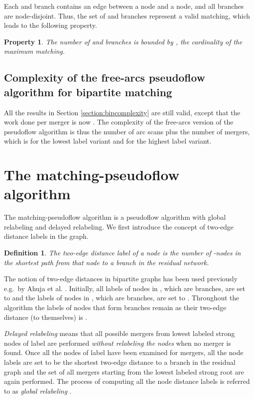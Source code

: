 \documentclass{article}
\newtheorem{property}{Property}[section]
\newtheorem{definition}{Definition}[section]
\begin{document}
Each  and  branch contains an edge between a  node and a  node, and all branches are node-disjoint. Thus, the set of  and  branches represent a valid matching, which leads to the following property.

\begin{property}
\label{property:branchbound}
The number of  and  branches is bounded by , the cardinality of the maximum matching.
\end{property}

\subsection{Complexity of the free-arcs pseudoflow algorithm for bipartite matching}

All the results in Section \ref{section:bipcomplexity} are still valid, except that the work done per merger is now .  The complexity of the free-arcs version of the pseudoflow algorithm is thus the number of arc scans plus the number of mergers, which is \mbox{} for the lowest label variant and  for the highest label variant.

\section{The matching-pseudoflow algorithm}
\label{section:matching-pseudoflow}

The {\sf matching-pseudoflow} algorithm is a pseudoflow algorithm with global relabeling and delayed relabeling.  We first introduce the concept of two-edge distance labels in the graph.

\begin{definition}
The {\em two-edge distance label} of a node is the number of -nodes in the shortest path from that node to a  branch in the residual network.
\end{definition}
The notion of two-edge distances in bipartite graphs has been used previously e.g.\ by Ahuja et al. \cite{AhuOST94}.  Initially, all labels of nodes in , which are  branches, are set to  and the labels of nodes in , which are  branches, are set to . Throughout the algorithm the labels of nodes that form  branches remain  as their two-edge distance (to themselves) is .

{\em Delayed relabeling} means that all possible mergers from lowest labeled strong nodes of label  are performed
{\em without relabeling the nodes} when no merger is found.  Once all the nodes of label  have been examined for mergers, all the node labels are set to be the shortest two-edge distance to a  branch in the residual graph and the set of all mergers starting from the lowest labeled strong root are again performed.  The process of computing all
the node distance labels is referred to as {\em global relabeling} \cite{GolC97}.
\end{document}
